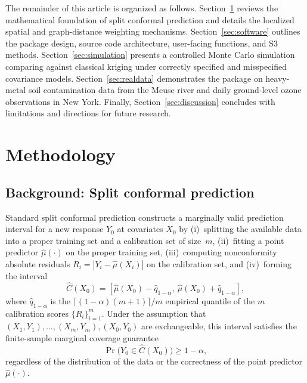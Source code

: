 \documentclass[article]{jss}
\begin{document}
The remainder of this article is organized as follows. Section~\ref{sec:methodology} reviews the mathematical foundation of split conformal prediction and details the localized spatial and graph-distance weighting mechanisms. Section~\ref{sec:software} outlines the package design, source code architecture, user-facing functions, and S3 methods. Section~\ref{sec:simulation} presents a controlled Monte Carlo simulation comparing  against classical kriging under correctly specified and misspecified covariance models. Section~\ref{sec:realdata} demonstrates the package on heavy-metal soil contamination data from the Meuse river and daily ground-level ozone observations in New York. Finally, Section~\ref{sec:discussion} concludes with limitations and directions for future research.
\section{Methodology}\label{sec:methodology}

\subsection{Background: Split conformal prediction}

Standard split conformal prediction \citep{Vovk+Gammerman+Shafer:2005, Lei+al:2018} constructs a marginally valid prediction interval for a new response $Y_0$ at covariates $X_0$ by (i)~splitting the available data into a proper training set and a calibration set of size~$m$, (ii)~fitting a point predictor $\hat\mu(\cdot)$ on the proper training set, (iii)~computing nonconformity absolute residuals $R_i = |Y_i - \hat\mu(X_i)|$ on the calibration set, and (iv)~forming the interval
%
\begin{equation} \label{eq:standard}
\hat{C}(X_0) = \left[\hat\mu(X_0) - \hat{q}_{1-\alpha},\ \hat\mu(X_0) + \hat{q}_{1-\alpha}\right],
\end{equation}
%
where $\hat{q}_{1-\alpha}$ is the $\lceil (1-\alpha)(m+1) \rceil / m$ empirical quantile of the $m$ calibration scores $\{R_i\}_{i=1}^m$. Under the assumption that $(X_1, Y_1), \ldots, (X_m, Y_m), (X_0, Y_0)$ are exchangeable, this interval satisfies the finite-sample marginal coverage guarantee
%
\begin{equation} \label{eq:validity}
\Pr\!\big(Y_0 \in \hat{C}(X_0)\big) \geq 1 - \alpha,
\end{equation}
%
regardless of the distribution of the data or the correctness of the point predictor $\hat\mu(\cdot)$.
\end{document}
